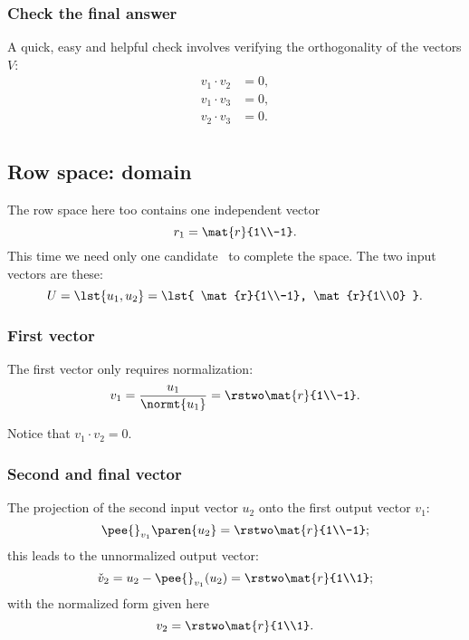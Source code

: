 \subsubsection{Check the final answer}
A quick, easy and helpful check involves verifying the orthogonality of the vectors $V$:
\begin{equation}
  \begin{split}
    v_{1}\cdot v_{2} &= 0,\\
    v_{1}\cdot v_{3} &= 0,\\
    v_{2}\cdot v_{3} &= 0.\\
  \end{split}
\end{equation}

\subsection{Row space: domain}
\label{sec:gs:row}
The row space here too contains one independent vector
\begin{equation}
  r_{1} = \mat{r}{1\\-1}.
\end{equation}
This time we need only one candidate \vv \ to complete the space. The two input vectors are these:
\begin{equation}
  U = \lst{u_{1},u_{2}} = \lst{
  \mat{r}{1\\-1},
  \mat{r}{1\\0}
  }.
\end{equation}

\subsubsection{First vector}
The first vector only requires normalization:
\begin{equation}
  v_{1} = 
    \frac{u_{1}}{\normt{u_{1}}} = 
    \rstwo \mat{r}{1\\-1}.
\end{equation}

Notice that $v_{1}\cdot v_{2}=0$.

\subsubsection{Second and final vector}
The projection of the second input vector $u_{2}$ onto the first output vector $v_{1}$:
\begin{equation}
  \pee{}_{v_{1}}\paren{u_{2}}  = \rstwo \mat{r}{1\\-1};
\end{equation}
this leads to the unnormalized output vector:
\begin{equation}
  \check{v}_{2}= u_{2} - \pee{}_{v_{1}}(u_{2}) = \rstwo\mat{r}{1\\1};
\end{equation}
with the normalized form given here
\begin{equation}
  v_{2} = \rstwo \mat{r}{1\\1}.
  \label{eq:gs:a}
\end{equation}

